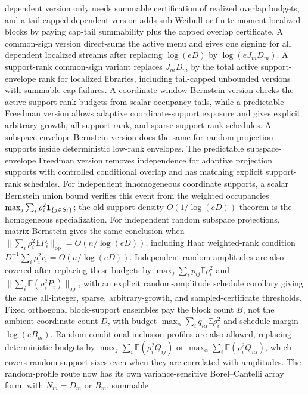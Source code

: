 \documentclass[11pt]{article}
\begin{document}
dependent version only needs summable certification of realized overlap budgets,
and a tail-capped dependent version adds sub-Weibull or finite-moment localized
blocks by paying cap-tail summability plus the capped overlap certificate.  A
common-sign version direct-sums the active menu and gives one signing for all
dependent localized streams after replacing \(\log(eD)\) by
\(\log(eJ_mD_m)\).  A support-rank common-sign variant replaces \(J_mD_m\)
by the total active support-envelope rank for localized libraries, including
tail-capped unbounded versions with summable cap failures.  A coordinate-window
Bernstein version checks the active support-rank budgets from scalar occupancy
tails, while a predictable Freedman version allows adaptive coordinate-support
exposure and gives explicit arbitrary-growth, all-support-rank, and
sparse-support-rank schedules.  A subspace-envelope Bernstein version does the
same for random projection supports inside deterministic low-rank envelopes.
The predictable subspace-envelope Freedman version removes independence for
adaptive projection supports with controlled conditional overlap and has
matching explicit support-rank schedules.  For independent inhomogeneous
coordinate supports, a scalar Bernstein union bound
verifies this event from the weighted occupancies \(\max_j\sum_i\rho_i^2{\bf 1}_{\{j\in S_i\}}\);
the old support-density \(O(1/\log(eD))\) theorem is the homogeneous
specialization.  For independent random subspace projections, matrix Bernstein
gives the same conclusion when
\(\|\sum_i\rho_i^2\mathbb E P_i\|_{\mathrm{op}}=O(n/\log(eD))\), including Haar
weighted-rank condition \(D^{-1}\sum_i\rho_i^2r_i=O(n/\log(eD))\).  Independent
random amplitudes are also covered after replacing these budgets by
\(\max_j\sum_i p_{ij}\mathbb E\rho_i^2\) and
\(\|\sum_i\mathbb E(\rho_i^2P_i)\|_{\mathrm{op}}\), with an explicit
random-amplitude schedule corollary giving the same all-integer, sparse,
arbitrary-growth, and sampled-certificate thresholds.  Fixed orthogonal
block-support ensembles pay the block count \(B\), not the ambient coordinate
count \(D\), with budget \(\max_\alpha\sum_iq_{i\alpha}\mathbb E\rho_i^2\) and
schedule margin \(\log(eB_m)\).  Random conditional inclusion profiles are
also allowed, replacing deterministic budgets by
\(\max_j\sum_i\mathbb E(\rho_i^2Q_{ij})\) or
\(\max_\alpha\sum_i\mathbb E(\rho_i^2Q_{i\alpha})\), which covers random support
sizes even when they are correlated with amplitudes.  The random-profile route
now has its own variance-sensitive Borel--Cantelli array form: with
\(N_m=D_m\) or \(B_m\), summable
\end{document}
